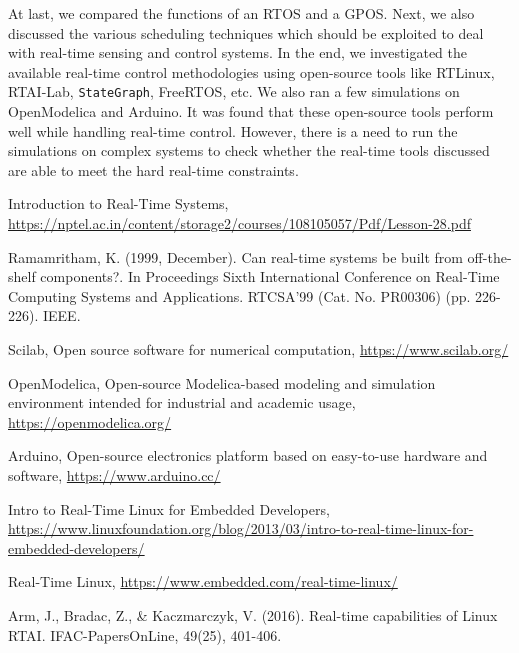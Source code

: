 \documentclass[12pt]{report}
\begin{document}
At last, we compared the functions of an RTOS and a GPOS. Next, we also discussed the various scheduling techniques which should be exploited to deal with real-time sensing and control systems. In the end, we investigated the available real-time control methodologies using open-source tools like RTLinux, RTAI-Lab, \texttt{StateGraph}, FreeRTOS, etc. We also ran a few simulations on OpenModelica and Arduino. It was found that these open-source tools perform well while handling real-time control. However, there is a need to run the simulations on complex systems to check whether the real-time tools discussed are able to meet the hard real-time constraints. 




\begin{thebibliography}{111}

Introduction to Real-Time Systems, \url{https://nptel.ac.in/content/storage2/courses/108105057/Pdf/Lesson-28.pdf}

Ramamritham, K. (1999, December). Can real-time systems be built from off-the-shelf components?. In Proceedings Sixth International Conference on Real-Time Computing Systems and Applications. RTCSA'99 (Cat. No. PR00306) (pp. 226-226). IEEE.

Scilab, Open source software for numerical computation, \url{https://www.scilab.org/}

OpenModelica, Open-source Modelica-based modeling and simulation environment intended for industrial and academic usage, \url{https://openmodelica.org/}

Arduino, Open-source electronics platform based on easy-to-use hardware and software, \url{https://www.arduino.cc/}

Intro to Real-Time Linux for Embedded Developers, \url{https://www.linuxfoundation.org/blog/2013/03/intro-to-real-time-linux-for-embedded-developers/}

Real-Time Linux, \url{https://www.embedded.com/real-time-linux/}


Arm, J., Bradac, Z., \& Kaczmarczyk, V. (2016). Real-time capabilities of Linux RTAI. IFAC-PapersOnLine, 49(25), 401-406.


\end{thebibliography}
\end{document}
